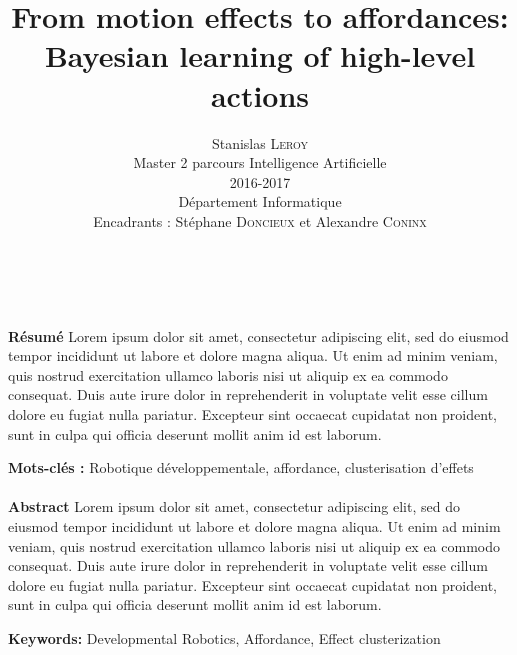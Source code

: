 \documentclass{llncs}
\begin{document}
\title{From motion effects to affordances: Bayesian learning of high-level actions}

\author{Stanislas \textsc{Leroy}\\
   Master 2 parcours Intelligence Artificielle\\
   2016-2017\\
   Département Informatique\\
   Encadrants : Stéphane \textsc{Doncieux} et Alexandre \textsc{Coninx}}

\maketitle

\ \\\\\textbf{Résumé} Lorem ipsum dolor sit amet, consectetur adipiscing elit, sed do eiusmod tempor incididunt ut labore et dolore magna aliqua. Ut enim ad minim veniam, quis nostrud exercitation ullamco laboris nisi ut aliquip ex ea commodo consequat. Duis aute irure dolor in reprehenderit in voluptate velit esse cillum dolore eu fugiat nulla pariatur. Excepteur sint occaecat cupidatat non proident, sunt in culpa qui officia deserunt mollit anim id est laborum.

\textbf{Mots-clés :} Robotique développementale, affordance, clusterisation d'effets\\\\



\textbf{Abstract} Lorem ipsum dolor sit amet, consectetur adipiscing elit, sed do eiusmod tempor incididunt ut labore et dolore magna aliqua. Ut enim ad minim veniam, quis nostrud exercitation ullamco laboris nisi ut aliquip ex ea commodo consequat. Duis aute irure dolor in reprehenderit in voluptate velit esse cillum dolore eu fugiat nulla pariatur. Excepteur sint occaecat cupidatat non proident, sunt in culpa qui officia deserunt mollit anim id est laborum.

\textbf{Keywords:} Developmental Robotics, Affordance, Effect clusterization

\end{document}

